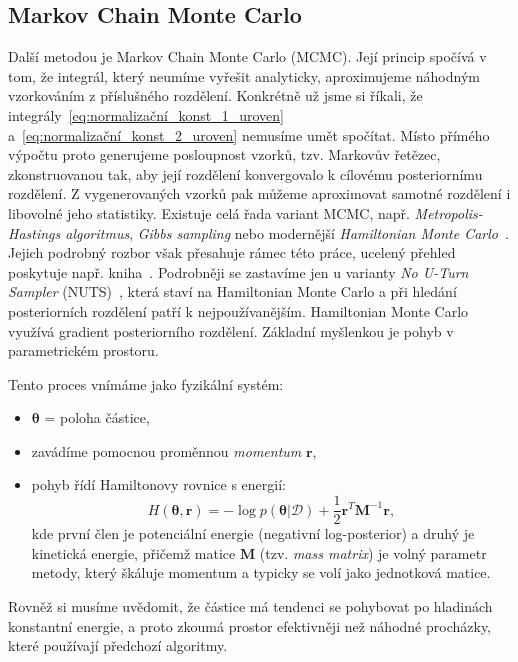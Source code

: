 \subsection{Markov Chain Monte Carlo}
\label{subsec:mcmc}
Další metodou je Markov Chain Monte Carlo (MCMC).
Její princip spočívá v tom, že integrál, který neumíme vyřešit analyticky, aproximujeme náhodným vzorkováním z příslušného rozdělení.
Konkrétně už jsme si říkali, že integrály~\eqref{eq:normalizační_konst_1_uroven} a~\eqref{eq:normalizační_konst_2_uroven} nemusíme umět spočítat.
Místo přímého výpočtu proto generujeme posloupnost vzorků, tzv. Markovův řetězec, zkonstruovanou tak, aby její rozdělení konvergovalo k cílovému posteriornímu rozdělení.
Z vygenerovaných vzorků pak můžeme aproximovat samotné rozdělení i libovolné jeho statistiky.
Existuje celá řada variant MCMC, např. \textit{Metropolis-Hastings algoritmus}, \textit{Gibbs sampling} nebo modernější \textit{Hamiltonian Monte Carlo}~\cite{neal2011}.
Jejich podrobný rozbor však přesahuje rámec této práce, ucelený přehled poskytuje např. kniha~\cite{brooks2011}.
Podrobněji se zastavíme jen u varianty \textit{No U-Turn Sampler} (NUTS)~\cite{hoffman2014}, která staví na Hamiltonian Monte Carlo a při hledání posteriorních rozdělení patří k nejpoužívanějším.
Hamiltonian Monte Carlo využívá gradient posteriorního rozdělení.
Základní myšlenkou je pohyb v parametrickém prostoru.
\par

Tento proces vnímáme jako fyzikální systém:
\begin{itemize}
    \item $\boldsymbol{\theta}$ = poloha částice,
    \item zavádíme pomocnou proměnnou \emph{momentum} $\mathbf{r}$,
    \item pohyb řídí Hamiltonovy rovnice s energií:
    \[ 
    H(\boldsymbol{\theta}, \mathbf{r}) = -\log p(\boldsymbol{\theta} | \mathcal{D}) + \frac{1}{2}\mathbf{r}^T \mathbf{M}^{-1} \mathbf{r},
    \]
    kde první člen je potenciální energie (negativní log-posterior) a druhý je kinetická energie, přičemž matice $\mathbf{M}$ (tzv. \emph{mass matrix}) je volný parametr metody, který škáluje momentum a typicky se volí jako jednotková matice.
\end{itemize}

Rovněž si musíme uvědomit, že částice má tendenci se pohybovat po hladinách konstantní energie, a proto zkoumá prostor efektivněji než náhodné procházky, které používají předchozí algoritmy.

